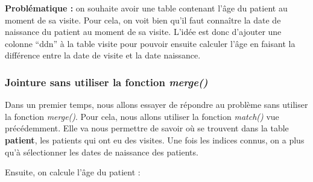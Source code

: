 \documentclass[
]{book}
\newenvironment{Shaded}{\begin{snugshade}}{\end{snugshade}}
\newcommand{\AttributeTok}[1]{\textcolor[rgb]{0.77,0.63,0.00}{#1}}
\newcommand{\DecValTok}[1]{\textcolor[rgb]{0.00,0.00,0.81}{#1}}
\newcommand{\FunctionTok}[1]{\textcolor[rgb]{0.00,0.00,0.00}{#1}}
\newcommand{\NormalTok}[1]{#1}
\newcommand{\OtherTok}[1]{\textcolor[rgb]{0.56,0.35,0.01}{#1}}
\newcommand{\SpecialCharTok}[1]{\textcolor[rgb]{0.00,0.00,0.00}{#1}}
\newcommand{\StringTok}[1]{\textcolor[rgb]{0.31,0.60,0.02}{#1}}
\theoremstyle{definition}
\theoremstyle{definition}
\theoremstyle{definition}
\theoremstyle{definition}
\theoremstyle{remark}
\begin{document}
\textbf{Problématique :} on souhaite avoir une table contenant l'âge du patient au moment de sa visite. Pour cela, on voit bien qu'il faut connaître la date de naissance du patient au moment de sa visite. L'idée est donc d'ajouter une colonne ``ddn'' à la table visite pour pouvoir ensuite calculer l'âge en faisant la différence entre la date de visite et la date naissance.

\hypertarget{jointure-sans-utiliser-la-fonction-merge}{%
\subsubsection{\texorpdfstring{Jointure sans utiliser la fonction \emph{merge()}}{Jointure sans utiliser la fonction merge()}}\label{jointure-sans-utiliser-la-fonction-merge}}

Dans un premier temps, nous allons essayer de répondre au problème sans utiliser la fonction \emph{merge()}. Pour cela, nous allons utiliser la fonction \emph{match()} vue précédemment. Elle va nous permettre de savoir où se trouvent dans la table \textbf{patient}, les patients qui ont eu des visites. Une fois les indices connus, on a plus qu'à sélectionner les dates de naissance des patients.

\begin{Shaded}
\end{Shaded}

Ensuite, on calcule l'âge du patient :

\begin{Shaded}
\end{Shaded}
\end{document}
